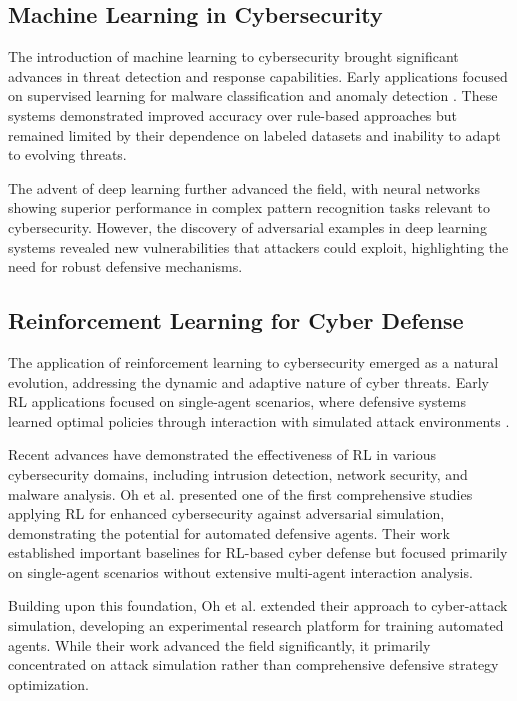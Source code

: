\documentclass[12pt,twoside]{article}
\begin{document}
\subsection{Machine Learning in Cybersecurity}

The introduction of machine learning to cybersecurity brought significant advances in threat detection and response capabilities. Early applications focused on supervised learning for malware classification and anomaly detection \cite{sommer2010outside}. These systems demonstrated improved accuracy over rule-based approaches but remained limited by their dependence on labeled datasets and inability to adapt to evolving threats.

The advent of deep learning further advanced the field, with neural networks showing superior performance in complex pattern recognition tasks relevant to cybersecurity. However, the discovery of adversarial examples in deep learning systems \cite{goodfellow2014explaining} revealed new vulnerabilities that attackers could exploit, highlighting the need for robust defensive mechanisms.

\subsection{Reinforcement Learning for Cyber Defense}

The application of reinforcement learning to cybersecurity emerged as a natural evolution, addressing the dynamic and adaptive nature of cyber threats. Early RL applications focused on single-agent scenarios, where defensive systems learned optimal policies through interaction with simulated attack environments \cite{malialis2015distributed}.

Recent advances have demonstrated the effectiveness of RL in various cybersecurity domains, including intrusion detection, network security, and malware analysis. Oh et al. \cite{oh2023applying} presented one of the first comprehensive studies applying RL for enhanced cybersecurity against adversarial simulation, demonstrating the potential for automated defensive agents. Their work established important baselines for RL-based cyber defense but focused primarily on single-agent scenarios without extensive multi-agent interaction analysis.

Building upon this foundation, Oh et al. \cite{oh2024employing} extended their approach to cyber-attack simulation, developing an experimental research platform for training automated agents. While their work advanced the field significantly, it primarily concentrated on attack simulation rather than comprehensive defensive strategy optimization.
\end{document}
